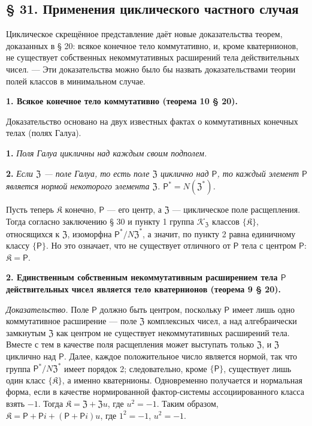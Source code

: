 \documentclass[11pt]{article}
\begin{document}
\subsection*{§ 31. Применения циклического частного случая}\label{anwendungen-des-zyklischen-spezialfalles}

Циклическое скрещённое представление даёт новые доказательства теорем, доказанных в § 20: всякое конечное тело коммутативно, и, кроме кватернионов, не существует собственных некоммутативных расширений тела действительных чисел. --- Эти доказательства можно было бы назвать доказательствами теории полей классов в минимальном случае.

\noindent\textbf{1. Всякое конечное тело коммутативно (теорема 10 § 20).}

Доказательство основано на двух известных фактах о коммутативных конечных телах (полях Галуа).

\noindent\textbf{1.} \emph{Поля Галуа цикличны над каждым своим подполем.}

\noindent\textbf{2.} \emph{Если \(\mathfrak Z\) --- поле Галуа, то есть поле \(\mathfrak Z\) циклично над \(\mathsf{P}\), то каждый элемент \(\mathsf{P}\) является нормой некоторого элемента \(\mathfrak Z\). \(\mathsf{P}^*=N(\mathfrak Z^*)\).}

Пусть теперь \(\mathfrak K\) конечно, \(\mathsf{P}\) --- его центр, а \(\mathfrak Z\) --- циклическое поле расщепления. Тогда согласно заключению § 30 и пункту 1 группа \(\mathscr K_{\mathfrak Z}\) классов \(\{\mathfrak K\}\), относящихся к \(\mathfrak Z\), изоморфна \(\mathsf{P}^*/N\mathfrak Z^*\), а значит, по пункту 2 равна единичному классу \(\{\mathsf{P}\}\). Но это означает, что не существует отличного от \(\mathsf{P}\) тела с центром \(\mathsf{P}\): \(\mathfrak K=\mathsf{P}\).

\noindent\textbf{2. Единственным собственным некоммутативным расширением тела \(\mathsf{P}\) действительных чисел является тело кватернионов (теорема 9 § 20).}

\noindent\emph{Доказательство.} Поле \(\mathsf{P}\) должно быть центром, поскольку \(\mathsf{P}\) имеет лишь одно коммутативное расширение --- поле \(\mathfrak Z\) комплексных чисел, а над алгебраически замкнутым \(\mathfrak Z\) как центром не существует некоммутативных расширений тела. Вместе с тем в качестве поля расщепления может выступать только \(\mathfrak Z\), и \(\mathfrak Z\) циклично над \(\mathsf{P}\). Далее, каждое положительное число является нормой, так что группа \(\mathsf{P}^*/N\mathfrak Z^*\) имеет порядок 2; следовательно, кроме \(\{\mathsf{P}\}\), существует лишь один класс \(\{\mathfrak K\}\), а именно кватернионы. Одновременно получается и нормальная форма, если в качестве нормированной фактор-системы ассоциированного класса взять \(-1\). Тогда \(\mathfrak K=\mathfrak Z+\mathfrak Zu\), где \(u^2=-1\). Таким образом, \(\mathfrak K=\mathsf P+\mathsf Pi+(\mathsf P+\mathsf Pi)u\), где \(1^2=-1\), \(u^2=-1\).
\end{document}
